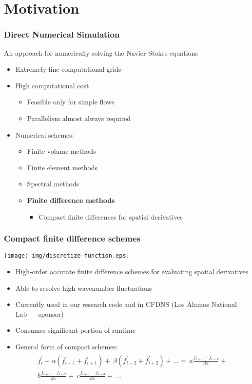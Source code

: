 
\section{Motivation}

\begin{frame}
\frametitle{Direct Numerical Simulation}

An approach for numerically solving
the Navier-Stokes equations

\begin{itemize}
\item Extremely fine computational grids
\item High computational cost
    \begin{itemize}
    \item Feasible only for simple flows
    \item Parallelism almost always required
    \end{itemize}
\item Numerical schemes:
    \begin{itemize}
    \item Finite volume methods
    \item Finite element methods
    \item Spectral methods
    \item \textbf{Finite difference methods}
        \begin{itemize}
            \item Compact finite differences for spatial derivatives
        \end{itemize}
    \end{itemize}
\end{itemize}
\end{frame}

\begin{frame}
\frametitle{Compact finite difference schemes}
\centering
\texttt{[image: img/discretize-function.eps]}
\begin{itemize}
\item High-order accurate finite difference schemes
for evaluating spatial derivatives
\item Able to resolve high wavenumber fluctuations
\item Currently used in our research code
    and in CFDNS (Los Alamos National Lab --- sponsor)
\item Consumes significant portion of runtime
\item {General form of compact schemes:
\begin{align*}
\begin{split}
f_i^{\prime} + \alpha(f^{\prime}_{i-1} + f^{\prime}_{i+1}) + \
\beta(f^{\prime}_{i-2} + f^{\prime}_{i+2}) + \hdots  = \
a\frac{f_{i+1} - f_{i-1}}{dx} + \\
b\frac{f_{i+2} - f_{i-2}}{dx} + \
c\frac{f_{i+3} - f_{i-3}}{dx} + \
    \hdots
\end{split}
\end{align*}}
\end{itemize}
\end{frame}

